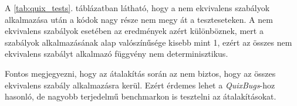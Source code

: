 A \ref{tab:quix_tests}. táblázatban látható, hogy a nem ekvivalens szabályok alkalmazása után
a kódok nagy része nem megy át a teszteseteken.
A nem ekvivalens szabályok esetében az eredmények azért különböznek,
mert a szabályok alkalmazásának alap valószínűsége kisebb mint 1,
ezért az összes nem ekvivalens szabályt alkalmazó függvény nem determinisztikus.

Fontos megjegyezni, hogy az átalakítás során az nem biztos, hogy az összes ekvivalens szabály alkalmazásra kerül.
Ezért érdemes lehet a \emph{QuixBugs}-hoz hasonló, de nagyobb terjedelmű benchmarkon is tesztelni az átalakításokat.

\pagebreak
